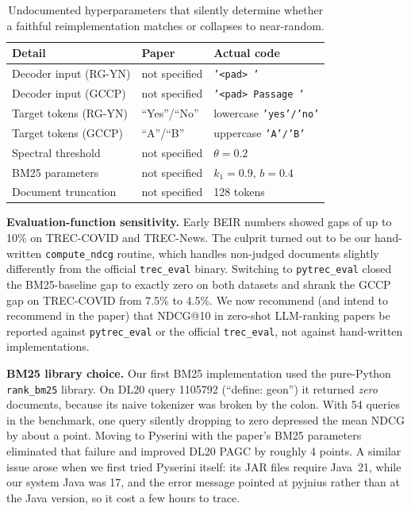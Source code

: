 \documentclass[conference]{IEEEtran}
\begin{document}
\begin{table}[h]
\centering
\scriptsize
\begin{tabular}{@{}lll@{}}
\toprule
\textbf{Detail} & \textbf{Paper} & \textbf{Actual code} \\
\midrule
Decoder input (RG-YN)   & not specified & \texttt{'<pad> '} \\
Decoder input (GCCP)    & not specified & \texttt{'<pad> Passage '} \\
Target tokens (RG-YN)   & ``Yes''/``No'' & lowercase \texttt{'yes'/'no'} \\
Target tokens (GCCP)    & ``A''/``B'' & uppercase \texttt{'A'/'B'} \\
Spectral threshold      & not specified & $\theta = 0.2$ \\
BM25 parameters         & not specified & $k_1{=}0.9,\, b{=}0.4$ \\
Document truncation     & not specified & 128 tokens \\
\bottomrule
\end{tabular}
\caption{Undocumented hyperparameters that silently determine whether a faithful reimplementation matches or collapses to near-random.}
\label{tab:undoc}
\end{table}

\textbf{Evaluation-function sensitivity.}
Early BEIR numbers showed gaps of up to 10\% on TREC-COVID and TREC-News. The culprit turned out to be our hand-written \texttt{compute\_ndcg} routine, which handles non-judged documents slightly differently from the official \texttt{trec\_eval} binary. Switching to \texttt{pytrec\_eval} closed the BM25-baseline gap to exactly zero on both datasets and shrank the GCCP gap on TREC-COVID from 7.5\% to 4.5\%. We now recommend (and intend to recommend in the paper) that NDCG@10 in zero-shot LLM-ranking papers be reported against \texttt{pytrec\_eval} or the official \texttt{trec\_eval}, not against hand-written implementations.

\textbf{BM25 library choice.}
Our first BM25 implementation used the pure-Python \texttt{rank\_bm25} library. On DL20 query 1105792 (``define: geon'') it returned \emph{zero} documents, because its naive tokenizer was broken by the colon. With 54 queries in the benchmark, one query silently dropping to zero depressed the mean NDCG by about a point. Moving to Pyserini with the paper's BM25 parameters eliminated that failure and improved DL20 PAGC by roughly 4 points. A similar issue arose when we first tried Pyserini itself: its JAR files require Java~21, while our system Java was 17, and the error message pointed at pyjnius rather than at the Java version, so it cost a few hours to trace.
\end{document}

